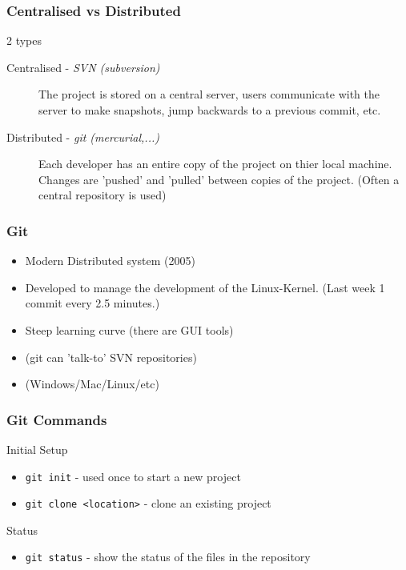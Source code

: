 \documentclass{beamer}
\begin{document}
\begin{frame}
\frametitle{Centralised vs Distributed}
\begin{block}
{2 types}
\begin{description}
\item[Centralised - \emph{SVN (subversion)} ] The project is stored on a central server, users communicate with the server to make snapshots, jump backwards to a previous commit, etc.
\item[Distributed - \emph{git (mercurial,...)} ] Each developer has an entire copy of the project on thier local machine. Changes are 'pushed' and 'pulled' between copies of the project. (Often a central repository is used)
\end{description}
\end{block}
\end{frame}
%
\begin{frame}
\frametitle{Git}
\begin{block}{}
\begin{itemize}
\item Modern Distributed system (2005)
\item Developed to manage the development of the Linux-Kernel. (Last week 1 commit every 2.5 minutes.)
\item Steep learning curve (there are GUI tools)
\item (git can 'talk-to' SVN repositories)
\item (Windows/Mac/Linux/etc)
\end{itemize}
\end{block}
\end{frame}


\begin{frame}[fragile]
\frametitle{Git Commands}
%
\begin{block}{Initial Setup}
\begin{itemize}
\item \verb|git init| - used once to start a new project
\item \verb|git clone <location>| - clone an existing project
\end{itemize}
\end{block}


\begin{block}{Status}
\begin{itemize}
\item \verb|git status| - show the status of the files in the repository
\end{itemize}
\end{block}

\end{frame}
\end{document}
